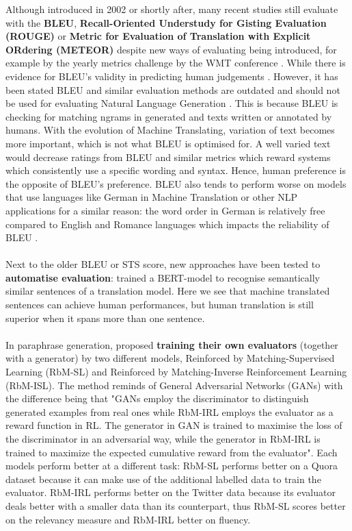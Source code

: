 \documentclass[11pt,a4paper]{article}
\begin{document}
Although introduced in 2002 or shortly after, many recent studies still evaluate with the \textbf{BLEU}, \textbf{Recall-Oriented Understudy for Gisting Evaluation (ROUGE)} or \textbf{Metric for Evaluation of Translation with Explicit ORdering (METEOR)} \citep{lin-2004-rouge, banerjee-lavie-2005-meteor} despite new ways of evaluating being introduced, for example by the yearly metrics challenge by the WMT conference \citep{SIGMT-2020}. While there is evidence for BLEU's validity in predicting human judgements \citep{reiter-2018-astructured}. However, it has been stated BLEU and similar evaluation methods are outdated and should not be used for evaluating Natural Language Generation \citep{reiter-2020-small, reiter-2020-why, reiter-2018-astructured, mathur-etal-2020-tangled}. This is because BLEU is checking for matching ngrams in generated and texts written or annotated by humans. With the evolution of Machine Translating, variation of text becomes more important, which is not what BLEU is optimised for. A well varied text would decrease ratings from BLEU and similar metrics which reward systems which consistently use a specific wording and syntax. Hence, human preference is the opposite of BLEU's preference. BLEU also tends to perform worse on models that use languages like German in Machine Translation or other NLP applications for a similar reason: the word order in German is relatively free compared to English and Romance languages which impacts the reliability of BLEU \citet{reiter-2018-bleu}.\\\\
Next to the older BLEU or STS score, new approaches have been tested to \textbf{automatise evaluation}: \citet{yasui-etal-2019} trained a BERT-model to recognise semantically similar sentences of a translation model. Here we see that machine translated sentences can achieve human performances, but human translation is still superior when it spans more than one sentence. \\\\ 
In paraphrase generation, \citet{li-etal-2018-paraphrase} proposed \textbf{training their own evaluators} (together with a generator) by two different models, Reinforced by Matching-Supervised Learning (RbM-SL) and Reinforced by Matching-Inverse Reinforcement Learning (RbM-ISL). The method reminds of General Adversarial Networks (GANs) with the difference being that "GANs employ the discriminator to distinguish generated examples from real ones while RbM-IRL employs the evaluator as a reward function in RL. The generator in GAN is trained to maximise the loss of the discriminator in an adversarial way, while the generator in RbM-IRL is trained to maximize the expected cumulative reward from the evaluator". Each models perform better at a different task: RbM-SL performs better on a Quora dataset because it can make use of the additional labelled data to train the evaluator. RbM-IRL performs better on the Twitter data because its evaluator deals better with a smaller data than its counterpart, thus RbM-SL scores better on the relevancy measure and RbM-IRL better on fluency.
\end{document}
